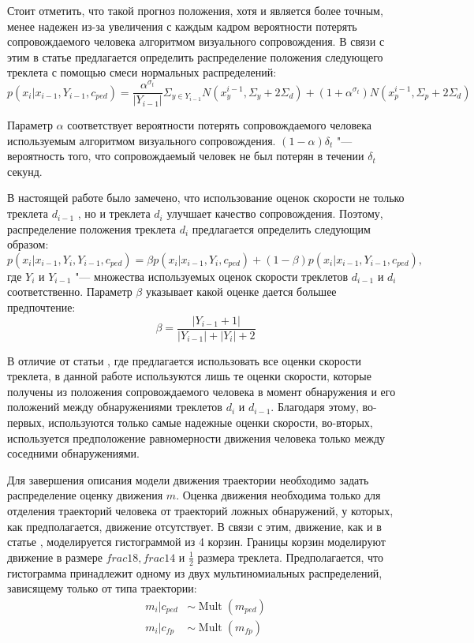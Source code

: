 Стоит отметить, что такой прогноз положения, хотя и является более точным, менее надежен из-за увеличения с каждым кадром вероятности потерять сопровождаемого человека алгоритмом визуального сопровождения. В связи с этим в статье \cite{benfold2011stable} предлагается определить распределение положения следующего треклета с помощью смеси нормальных распределений:
\begin{equation}
p(x_i|x_{i-1}, Y_{i-1}, c_{ped}) = \frac{\alpha^{\sigma_t}}{\left|Y_{i-1}\right|}\Sigma_{y\in Y_{i-1}}N(x_y^{i-1}, \Sigma_y + 2\Sigma_d) + (1+\alpha^{\sigma_t})N(x_p^{i-1}, \Sigma_p + 2\Sigma_d)
\end{equation}

Параметр $\alpha$ соответствует вероятности потерять сопровождаемого человека используемым алгоритмом визуального сопровождения. $(1-\alpha)\delta_t$ "--- вероятность того, что сопровождаемый человек не был потерян в течении $\delta_t$ секунд.

В настоящей работе было замечено, что использование оценок скорости не только треклета $d_{i-1}$ , но и треклета $d_i$ улучшает качество сопровождения. Поэтому, распределение положения треклета $d_i$ предлагается определить следующим образом:
\begin{equation}
	p(x_i |x_{i-1}, Y_i, Y_{i-1}, c_{ped}) = \beta p(x_i|x_{i-1}, Y_i, c_{ped}) + (1 - \beta) p(x_i|x_{i-1}, Y_{i-1}, c_{ped}),
\end{equation}
где $Y_i$ и $Y_{i-1}$ "--- множества используемых оценок скорости треклетов $d_{i-1}$ и $d_i$ соответственно. Параметр $\beta$ указывает какой оценке дается большее предпочтение:
\begin{equation}
	\beta=\frac{\left|Y_{i-1} + 1\right|}{\left|Y_{i-1}\right| + \left|Y_i\right| + 2}
\end{equation}

В отличие от статьи \cite{benfold2011stable}, где предлагается использовать все оценки скорости треклета, в данной работе используются лишь те оценки скорости, которые получены из положения сопровождаемого человека в момент обнаружения и его положений между обнаружениями треклетов $d_i$ и $d_{i-1}$. Благодаря этому, во-первых, используются только самые надежные оценки скорости, во-вторых, используется предположение равномерности движения человека только между соседними обнаружениями.

Для завершения описания модели движения траектории необходимо задать распределение оценку движения $m$. Оценка движения необходима только для отделения траекторий человека от траекторий ложных обнаружений, у которых, как предполагается, движение отсутствует. В связи с этим, движение, как и в статье \cite{benfold2011stable}, моделируется гистограммой из 4 корзин. Границы корзин моделируют движение в размере $frac{1}{8}, frac{1}{4}$ и $\frac{1}{2}$ размера треклета. Предполагается, что гистограмма принадлежит одному из двух мультиномиальных распределений, зависящему только от типа траектории:
\begin{align}
m_i |c_{ped} &\sim \mathop{Mult}(m_{ped}) \\
m_i |c_{fp} &\sim \mathop{Mult}(m_{fp})
\end{align}


